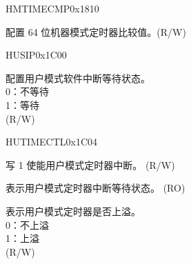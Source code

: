 \begin{register}{H}{MTIMECMP}{0x1810}\label{regdesc:CLINTMTIMECMPREG}
%
\regnewline%
%
\regnewline%
\begin{regdesc}
\begin{reglist}
\label{fielddesc:CLINTMTIMECMP}\item [MTIMECMP] 配置 64 位机器模式定时器比较值。(R/W)
\end{reglist}
\end{regdesc}
\end{register}

\begin{register}{H}{USIP}{0x1C00}\label{regdesc:CLINTUSIPREG}
%
%
\regnewline%
\begin{regdesc}
\begin{reglist}
\label{fielddesc:CLINTUSIP}\item[USIP] 配置用户模式软件中断等待状态。\\
0：不等待\\
1：等待\\
(R/W)
\end{reglist}
\end{regdesc}
\end{register}

\begin{register}{H}{UTIMECTL}{0x1C04}\label{regdesc:CLINTUTIMECTLREG}
%
%
%
%
%
\regnewline%
\begin{regdesc}
\begin{reglist}
\label{fielddesc:CLINTUTIMECTLUTIE}\item [UTIE] 写 1 使能用户模式定时器中断。 (R/W)
\label{fielddesc:CLINTUTIMECTLUTIP}\item [UTIP] 表示用户模式定时器中断等待状态。 (RO)
\label{fielddesc:CLINTUTIMECTLUTOF}\item [UTOF] 表示用户模式定时器是否上溢。\\
0：不上溢\\
1：上溢\\
(R/W)
\end{reglist}
\end{regdesc}
\end{register}

